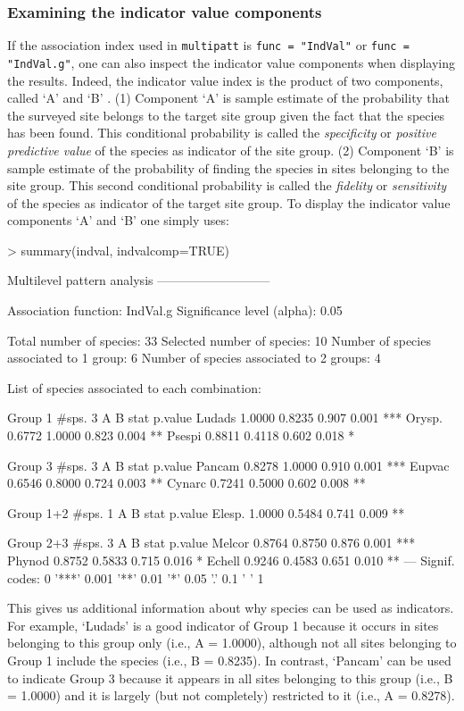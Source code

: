 \documentclass[11pt,a4paper]{article}
\begin{document}
\subsubsection{Examining the indicator value components}
If the association index used in \texttt{multipatt} is \texttt{func = "IndVal"} or \texttt{func = "IndVal.g"}, one can also inspect the indicator value components when displaying the results. Indeed, the indicator value index is the product of two components, called `A' and `B' \citep{Dufrene1997}\citep{DeCaceres2009}. (1) Component `A' is sample estimate of the probability that the surveyed site belongs to the target site group given the fact that the species has been found. This conditional probability is called the \emph{specificity} or \emph{positive predictive value} of the species as indicator of the site group. (2) Component `B' is sample estimate of the probability of finding the species in sites belonging to the site group. This second conditional probability is called the \emph{fidelity} or \emph{sensitivity} of the species as indicator of the target site group. To display the indicator value components `A' and `B' one simply uses:
\begin{Schunk}
\begin{Sinput}
> summary(indval, indvalcomp=TRUE)
\end{Sinput}
\begin{Soutput}
 Multilevel pattern analysis
 ---------------------------

 Association function: IndVal.g
 Significance level (alpha): 0.05

 Total number of species: 33
 Selected number of species: 10 
 Number of species associated to 1 group: 6 
 Number of species associated to 2 groups: 4 

 List of species associated to each combination: 

 Group 1  #sps.  3 
            A      B  stat p.value    
Ludads 1.0000 0.8235 0.907   0.001 ***
Orysp. 0.6772 1.0000 0.823   0.004 ** 
Psespi 0.8811 0.4118 0.602   0.018 *  

 Group 3  #sps.  3 
            A      B  stat p.value    
Pancam 0.8278 1.0000 0.910   0.001 ***
Eupvac 0.6546 0.8000 0.724   0.003 ** 
Cynarc 0.7241 0.5000 0.602   0.008 ** 

 Group 1+2  #sps.  1 
            A      B  stat p.value   
Elesp. 1.0000 0.5484 0.741   0.009 **

 Group 2+3  #sps.  3 
            A      B  stat p.value    
Melcor 0.8764 0.8750 0.876   0.001 ***
Phynod 0.8752 0.5833 0.715   0.016 *  
Echell 0.9246 0.4583 0.651   0.010 ** 
---
Signif. codes:  0 '***' 0.001 '**' 0.01 '*' 0.05 '.' 0.1 ' ' 1 
\end{Soutput}
\end{Schunk}
This gives us additional information about why species can be used as indicators. For example, `Ludads' is a good indicator of Group 1 because it occurs in sites belonging to this group only (i.e., A = 1.0000), although not all sites belonging to Group 1 include the species (i.e., B = 0.8235). In contrast, `Pancam' can be used to indicate Group 3 because it appears in all sites belonging to this group (i.e., B = 1.0000) and it is largely (but not completely) restricted to it (i.e., A = 0.8278).
\end{document}
